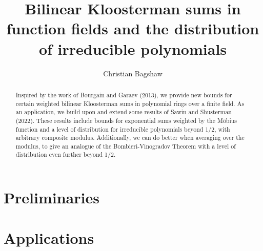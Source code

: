 \documentclass[12pt]{amsart}
\title[Bilinear Kloosterman sums in function fields ]{Bilinear Kloosterman sums in function fields and the distribution of irreducible polynomials}
\author[C.~Bagshaw]{Christian Bagshaw}
\begin{document}
\maketitle

\begin{abstract}
Inspired by the work of Bourgain and Garaev (2013), we provide new bounds for certain weighted bilinear Kloosterman sums in polynomial rings over a finite field. As an application, we build upon and extend some results of Sawin and Shusterman (2022). These results include bounds for exponential sums weighted by the M{\"o}bius function and a level of distribution for irreducible polynomials beyond 1/2, with arbitrary composite modulus. Additionally, we can do better when averaging over the modulus, to give an analogue of the Bombieri-Vinogradov Theorem with a level of distribution even further beyond 1/2. 
\end{abstract}

\tableofcontents

 
 
 \section{Preliminaries}
 
 
 


\section{Applications}








 



%
\end{document}
